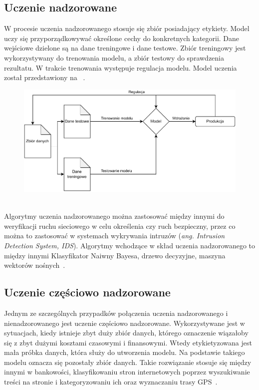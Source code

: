 \subsection{Uczenie nadzorowane}
W procesie uczenia nadzorowanego stosuje się zbiór posiadający etykiety. Model uczy się przyporządkowywać określone cechy do konkretnych kategorii. Dane wejściowe dzielone są na dane treningowe i dane testowe. Zbiór treningowy jest wykorzystywany do trenowania modelu, a zbiór testowy do sprawdzenia rezultatu. W trakcie trenowania występuje regulacja modelu. Model uczenia został przedstawiony na ~\cite{AiScience, Mahesh2018}.

\begin{figure}[H]
    \centering
    \includegraphics[width=1\textwidth]{images/supervised}
    \label{fig:spervised}
\end{figure}
\ \\
Algorytmy uczenia nadzorowanego można zastosować między innymi do weryfikacji ruchu sieciowego w celu określenia czy ruch bezpieczny, przez co można to zastosować w systemach wykrywania intruzów (\textit{ang. Intrusion Detection System, IDS}). Algorytmy wchodzące w skład uczenia nadzorowanego to między innymi Klasyfikator Naiwny Bayesa, drzewo decyzyjne, maszyna wektorów nośnych~\cite{AiScience, Mahesh2018}.

\subsection{Uczenie częściowo nadzorowane}
Jednym ze szczególnych przypadków połączenia uczenia nadzorowanego i nienadzorowanego jest uczenie częściowo nadzorowane. Wykorzystywane jest w sytuacjach, kiedy istnieje zbyt duży zbiór danych, którego oznaczenie wiązałoby się z zbyt dużymi kosztami czasowymi i finansowymi. Wtedy etykietyzowana jest mała próbka danych, która służy do utworzenia modelu. Na podstawie takiego modelu oznacza się pozostały zbiór danych. Takie rozwiązanie stosuje się między innymi w bankowości, klasyfikowaniu stron internetowych poprzez wyszukiwanie treści na stronie i kategoryzowaniu ich oraz wyznaczaniu trasy GPS~\cite{semiLinkedin, Mahesh2018}.

